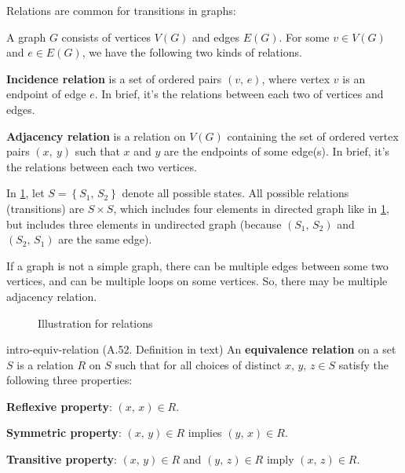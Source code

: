 \documentclass[../src/handouts/main.tex]{subfiles}
\begin{document}
Relations are common for transitions in graphs:
\begin{enumerate*}
  \item A graph $G$ consists of vertices $V(G)$ and edges $E(G)$. For some $v \in V(G)$ and $e \in E(G)$, we have the following two kinds of relations.
  \item \textbf{Incidence relation} is a set of ordered pairs $(v,\, e)$, where vertex $v$ is an endpoint of edge $e$. In brief, it's the relations between each two of vertices and edges.
  \item \textbf{Adjacency relation} is a relation on $V(G)$ containing the set of ordered vertex pairs $(x,\ y)$ such that $x$ and $y$ are the endpoints of some edge(s). In brief, it's the relations between each two vertices.
  \item In \cref{fig:intro-relation}, let $S = \left\{ S_1,\, S_2 \right\}$ denote all possible states. All possible relations (transitions) are $S \times S$, which includes four elements in directed graph like in \cref{fig:intro-relation}, but includes three elements in undirected graph (because $(S_1,\, S_2)$ and $(S_2,\, S_1)$ are the same edge).
  \item If a graph is not a simple graph, there can be multiple edges between some two vertices, and can be multiple loops on some vertices. So, there may be multiple adjacency relation.
\end{enumerate*}

\begin{figure}[ht]
  \centering
  \caption{Illustration for relations}
  \label{fig:intro-relation}
\end{figure}

\begin{definition}{}{intro-equiv-relation}
  (A.52. Definition in text)
  An \textbf{equivalence relation} on a set $S$ is a relation $R$ on $S$ such that for all choices of distinct $x,\, y,\,z \in S$ satisfy the following three properties:
  \begin{enumerate*}
    \item \textbf{Reflexive property}: $(x,\, x) \in R$.
    \item \textbf{Symmetric property}: $(x,\, y) \in R$ implies $(y,\, x) \in R$.
    \item \textbf{Transitive property}: $(x,\, y) \in R$ and $(y,\, z) \in R$ imply $(x,\, z) \in R$.
  \end{enumerate*}
\end{definition}
\end{document}

